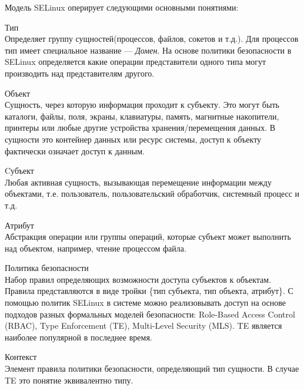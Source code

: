Модель SELinux оперирует следующими основными понятиями: 
\begin{description}
    \item{Тип} \hfill \\
        Определяет группу сущностей(процессов, файлов, сокетов и т.д.).
        Для процессов тип имеет специальное название — \emph{Домен}. На
        основе политики безопасности в SELinux определяется какие
        операции представители одного типа могут производить над
        представителям другого.  
    \item{Объект}  \hfill \\
        Сущность, через которую информация проходит к субъекту. Это
        могут быть каталоги, файлы, поля, экраны, клавиатуры, память,
        магнитные накопители, принтеры или любые другие устройства
        хранения/перемещения данных. В сущности это контейнер данных или
        ресурс системы, доступ к объекту фактически означает доступ к
        данным.  
    \item{Cубъект}  \hfill \\
        Любая активная сущность, вызывающая перемещение информации между
        объектами, т.е.  пользователь, пользовательский обработчик,
        системный процесс и т.д.  
    \item{Атрибут}  \hfill \\
        Абстракция операции или группы операций, которые субъект может
        выполнить над объектом, например, чтение процессом файла.  
    \item{Политика безопасности}  \hfill \\
        Набор правил определяющих возможности доступа субъектов к
        объектам. Правила представляются в виде тройки \{тип субъекта, тип
        объекта, атрибут\}. С помощью политик SELinux в системе можно
        реализовывать доступ на основе подходов разных формальных
        моделей безопасности: Role-Based Access Control (RBAC), Type
        Enforcement (TE), Multi-Level Security (MLS). TE является
        наиболее популярной в последнее время.   
    \item{Контекст}  \hfill \\
        Элемент правила политики безопасности, определяющий тип
        сущности. В случае TE это понятие эквивалентно типу.
\end{description}

